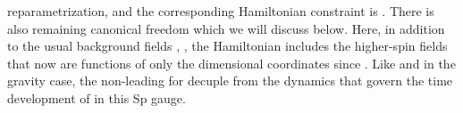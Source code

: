 \documentclass[a4paper,12pt]{article}
\begin{document}
reparametrization, and the corresponding Hamiltonian constraint is \coordHE{}%
. There is also remaining canonical freedom which we will discuss below.
Here, in addition to the usual background fields \coordHE{}, \coordHE{}, \coordHE{} the Hamiltonian
includes the higher-spin fields \coordHE{}
that now are functions of only the \coordHE{} dimensional coordinates \coordHE{}
since \coordHE{}. Like \myHighlight{$\gamma $}\coordHE{} and \coordHE{} in the gravity case, the
non-leading \coordHE{} for \coordHE{} decuple
from the dynamics that govern the time development of \coordHE{} in
this Sp\myHighlight{$\left( 2\right) $}\coordHE{} gauge.
\end{document}
